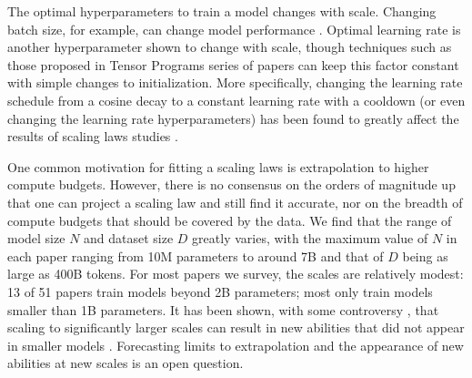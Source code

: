 The optimal hyperparameters to train a model changes with scale. Changing batch size, for example, can change model performance \cite{mccandlish2018empirical, kaplan2020scaling}. Optimal learning rate is another hyperparameter shown to change with scale, though techniques such as those proposed in Tensor Programs series of papers \citep{yang2022tensor} can keep this factor constant with simple changes to initialization. More specifically, changing the learning rate schedule from a cosine decay to a constant learning rate with a cooldown (or even changing the learning rate hyperparameters) has been found to greatly affect the results of scaling laws studies \citep{hu2024minicpm,porian2024resolving,hagele2024scaling, hoffmann2022training}.





One common motivation for fitting a scaling laws is extrapolation to higher compute budgets. However, there is no consensus on the orders of magnitude up that one can project a scaling law and still find it accurate, nor on the breadth of compute budgets that should be covered by the data. We find that the range of model size $N$ and dataset size $D$ greatly varies, with the maximum value of $N$ in each paper ranging from 10M parameters to around 7B and that of $D$ being as large as 400B tokens. 
For most papers we survey, the scales are relatively modest: 13 of 51 papers train models beyond 2B parameters; most only train models smaller than 1B parameters.
It has been shown, with some controversy \cite{schaeffer2023emergent}, that scaling to significantly larger scales can result in new abilities that did not appear in smaller models \citep{wei2022emergent}. Forecasting limits to extrapolation and the appearance of new abilities at new scales is an open question.

% 


